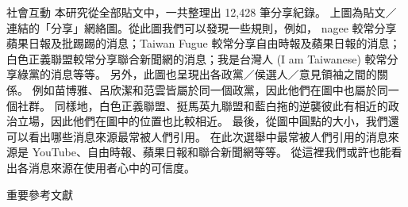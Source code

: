 \documentclass{beamer}
\begin{document}
\begin{CJK}{UTF8}{bkai}
\begin{frame}{社會互動}
\justifying
\qquad 本研究從全部貼文中，一共整理出 12,428 筆分享紀錄。%
上圖為貼文／連結的「分享」網絡圖。從此圖我們可以發現一些規則，例如，%
nagee 較常分享蘋果日報及批踢踢的消息；Taiwan Fugue 較常分享自由時報及蘋果日報的消息；%
白色正義聯盟較常分享聯合新聞網的消息；我是台灣人 (I am Taiwanese) 較常分享綠黨的消息等等。%
另外，此圖也呈現出各政黨／侯選人／意見領袖之間的關係。%
例如苗博雅、呂欣潔和范雲皆屬於同一個政黨，因此他們在圖中也屬於同一個社群。%
同樣地，白色正義聯盟、挺馬英九聯盟和藍白拖的逆襲彼此有相近的政治立場，因此他們在圖中的位置也比較相近。%
最後，從圖中圓點的大小，我們還可以看出哪些消息來源最常被人們引用。%
在此次選舉中最常被人們引用的消息來源是 YouTube、自由時報、蘋果日報和聯合新聞網等等。%
從這裡我們或許也能看出各消息來源在使用者心中的可信度。%
\end{frame}

\begin{frame}{重要參考文獻}
\nocite{*}


\end{frame}

\end{CJK}
\end{document}
